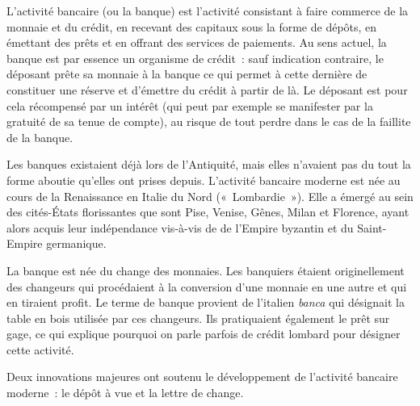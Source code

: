 L'activité bancaire (ou la banque) est l'activité consistant à faire commerce de la monnaie et du crédit, en recevant des capitaux sous la forme de dépôts, en émettant des prêts et en offrant des services de paiements. Au sens actuel, la banque est par essence un organisme de crédit~: sauf indication contraire, le déposant prête sa monnaie à la banque ce qui permet à cette dernière de constituer une réserve et d'émettre du crédit à partir de là. Le déposant est pour cela récompensé par un intérêt (qui peut par exemple se manifester par la gratuité de sa tenue de compte), au risque de tout perdre dans le cas de la faillite de la banque.



Les banques existaient déjà lors de l'Antiquité, mais elles n'avaient pas du tout la forme aboutie qu'elles ont prises depuis. L'activité bancaire moderne est née au cours de la Renaissance en Italie du Nord («~Lombardie~»). Elle a émergé au sein des cités-États florissantes que sont Pise, Venise, Gênes, Milan et Florence, ayant alors acquis leur indépendance vis-à-vis de de l'Empire byzantin et du Saint-Empire germanique.  %

La banque est née du change des monnaies. Les banquiers étaient originellement des changeurs qui procédaient à la conversion d'une monnaie en une autre et qui en tiraient profit. Le terme de banque provient de l'italien \emph{banca} qui désignait la table en bois utilisée par ces changeurs. Ils pratiquaient également le prêt sur gage, ce qui explique pourquoi on parle parfois de crédit lombard pour désigner cette activité.

Deux innovations majeures ont soutenu le développement de l'activité bancaire moderne~: le dépôt à vue et la lettre de change.

